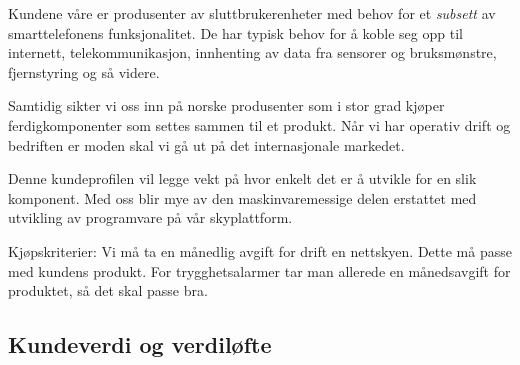 Kundene våre er produsenter av sluttbrukerenheter med behov for et
\textit{subsett} av smarttelefonens funksjonalitet. De har typisk behov for å
koble seg opp til internett, telekommunikasjon, innhenting av data fra sensorer
og bruksmønstre, fjernstyring og så videre.

Samtidig sikter vi oss inn på norske produsenter som i stor grad kjøper
ferdigkomponenter som settes sammen til et produkt.  Når vi har operativ drift
og bedriften er moden skal vi gå ut på det internasjonale markedet.

Denne kundeprofilen vil legge vekt på hvor enkelt det er å utvikle for en slik
komponent. Med oss blir mye av den maskinvaremessige delen erstattet med
utvikling av programvare på vår skyplattform.

Kjøpskriterier: Vi må ta en månedlig avgift for drift en nettskyen. Dette må
passe med kundens produkt. For trygghetsalarmer tar man allerede en
månedsavgift for produktet, så det skal passe bra.




\subsection{Kundeverdi og verdiløfte}


